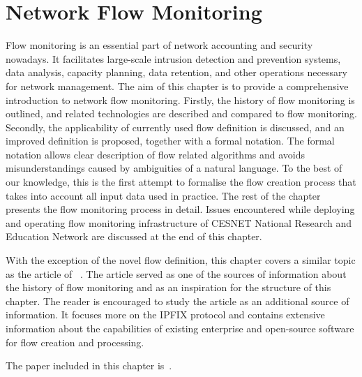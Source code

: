 \chapter{Network Flow Monitoring}\label{chap:network-flow-monitoring}

\begin{chapintro}

Flow monitoring is an essential part of network accounting and security nowadays. It facilitates large-scale intrusion detection and prevention systems, data analysis, capacity planning, data retention, and other operations necessary for network management. The aim of this chapter is to provide a comprehensive introduction to network flow monitoring. Firstly, the history of flow monitoring is outlined, and related technologies are described and compared to flow monitoring. Secondly, the applicability of currently used flow definition is discussed, and an improved definition is proposed, together with a formal notation. The formal notation allows clear description of flow related algorithms and avoids misunderstandings caused by ambiguities of a natural language. To the best of our knowledge, this is the first attempt to formalise the flow creation process that takes into account all input data used in practice. The rest of the chapter presents the flow monitoring process in detail. Issues encountered while deploying and operating flow monitoring infrastructure of CESNET National Research and Education Network are discussed at the end of this chapter.

With the exception of the novel flow definition, this chapter covers a similar topic as the article of \citeauthor{Hofstede-2014-Flow}~\cite{Hofstede-2014-Flow}. The article served as one of the sources of information about the history of flow monitoring and as an inspiration for the structure of this chapter. The reader is encouraged to study the article as an additional source of information. It focuses more on the IPFIX protocol and contains extensive information about the capabilities of existing enterprise and open-source software for flow creation and processing. 

The paper included in this chapter is~\cite{Velan-2018-Improving}.


\end{chapintro}
